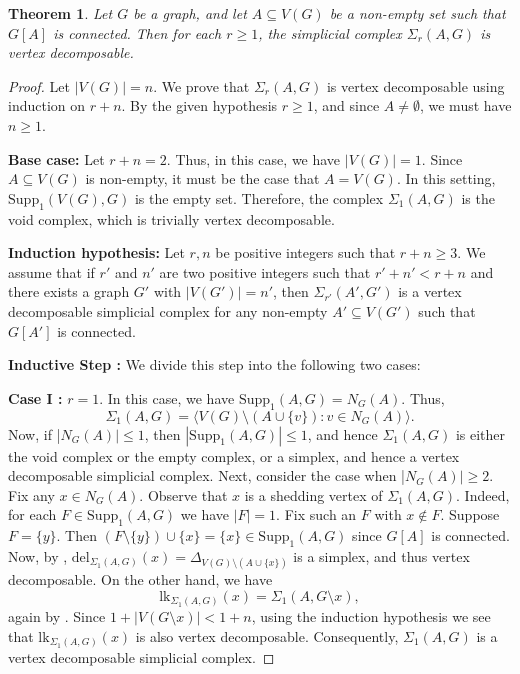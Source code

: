 \documentclass[12pt,reqno]{amsart}
\newtheorem{theorem}[proposition]{Theorem}
\theoremstyle{definition}
\newcommand{\lk}{{\mathrm{lk}}}
\newcommand{\del}{{\mathrm{del}}}
\newcommand{\Supp}{\mathrm{Supp}}
\def\del{\mathrm{del}}
\def\SrAG{\Sigma_r(A,G)}
\begin{document}
	\begin{theorem}\label{Vertex decoposable}
		Let $G$ be a graph, and let $A \subseteq V(G)$ be a non-empty set such that $G[A]$ is connected. Then for each $r \geq 1$, the simplicial complex $\Sigma_r(A,G)$ is vertex decomposable. 
	\end{theorem}
	\begin{proof}
		Let $|V(G)|=n$. We prove that $\SrAG$ is vertex decomposable using induction on $r+n$. By the given hypothesis $r\ge 1$, and since $A\neq\emptyset$, we must have $n\ge 1$.
		
		\medskip
		\noindent
		\textbf{Base case: }Let $r+n=2$. Thus, in this case, we have $|V(G)|=1$. Since $A \subseteq V(G)$ is non-empty, it must be the case that $A=V(G)$. In this setting, $\mathrm{Supp}_1(V(G),G)$ is the empty set. Therefore, the complex $\Sigma_1(A,G)$ is the void complex, which is trivially vertex decomposable.
		
		\medskip
		\noindent
		\textbf{Induction hypothesis: } Let $r,n$ be positive integers such that $r+n\ge 3$. We assume that if $r'$ and $n'$ are two positive integers such that $r'+n'<r+n$ and there exists a graph $G'$ with $|V(G')|=n'$, then $\Sigma_{r'}(A',G')$ is a vertex decomposable simplicial complex for any non-empty $A'\subseteq V(G')$ such that $G[A']$ is connected.
		
		\medskip
		\noindent
		\textbf{Inductive Step :} We divide this step into the following two cases:
		
		\medskip
		\noindent
		\textbf{Case I :} $r=1$. In this case, we have $\mathrm{Supp}_1(A,G) =N_G(A)$. Thus, \[
		\Sigma_1(A,G) = \langle V(G) \setminus (A \cup \{v\}) : v \in N_G(A) \rangle.
		\]
		Now, if |$N_G(A)| \le 1$, then $|\mathrm{Supp}_1(A,G)| \le 1$, and hence $\Sigma_1(A,G)$ is either the void complex or the empty complex, or a simplex, and hence a vertex decomposable simplicial complex. Next, consider the case when |$N_G(A)| \ge 2$. Fix any $x \in N_G(A)$. Observe that $x$ is a shedding vertex of $\Sigma_1(A,G)$. Indeed, for each $F\in \Supp_1(A,G)$ we have $|F|=1$. Fix such an $F$ with $x\notin F$. Suppose $F=\{y\}$. Then $(F\setminus\{y\})\cup\{x\}=\{x\}\in\Supp_1(A,G)$ since $G[A]$ is connected. Now, by , $\del_{\Sigma_1(A,G)}(x) =\Delta_{V(G)\setminus (A\cup\{x\})}$ is a simplex, and thus vertex decomposable. On the other hand, we have 
        \[\lk_{\Sigma_1(A,G)}(x) = \Sigma_1(A,G\setminus x),\] again by . Since $1+|V(G\setminus x)|<1+n$, using the induction hypothesis we see that $\lk_{\Sigma_1(A,G)}(x)$ is also vertex decomposable. Consequently, $\Sigma_1(A,G)$ is a vertex decomposable simplicial complex.
		

\end{proof}
\end{document}
